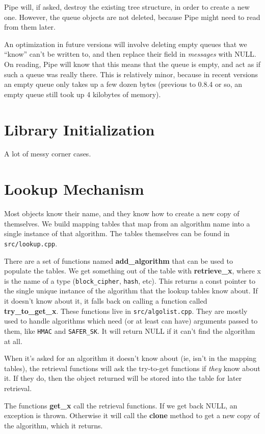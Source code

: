 \documentclass{article}
\newcommand{\filename}[1]{\texttt{#1}}
\newcommand{\function}[1]{\textbf{#1}}
\newcommand{\type}[1]{\texttt{#1}}
\renewcommand{\arg}[1]{\textsl{#1}}
\begin{document}
Pipe will, if asked, destroy the existing tree structure, in order to create a
new one. However, the queue objects are not deleted, because Pipe might need to
read from them later.

An optimization in future versions will involve deleting empty queues that we
``know'' can't be written to, and then replace their field in \arg{messages}
with NULL. On reading, Pipe will know that this means that the queue is empty,
and act as if such a queue was really there. This is relatively minor, because
in recent versions an empty queue only takes up a few dozen bytes (previous to
0.8.4 or so, an empty queue still took up 4 kilobytes of memory).

\section{Library Initialization}

A lot of messy corner cases.

\section{Lookup Mechanism}

Most objects know their name, and they know how to create a new copy of
themselves. We build mapping tables that map from an algorithm name into a
single instance of that algorithm. The tables themselves can be found in
\filename{src/lookup.cpp}.

There are a set of functions named \function{add\_algorithm} that can be used
to populate the tables. We get something out of the table with
\function{retrieve\_x}, where x is the name of a type (\texttt{block\_cipher},
\texttt{hash}, etc). This returns a const pointer to the single unique instance
of the algorithm that the lookup tables know about. If it doesn't know about
it, it falls back on calling a function called
\function{try\_to\_get\_x}. These functions live in
\filename{src/algolist.cpp}. They are mostly used to handle algorithms which
need (or at least can have) arguments passed to them, like \type{HMAC} and
\type{SAFER\_SK}. It will return NULL if it can't find the algorithm at all.

When it's asked for an algorithm it doesn't know about (ie, isn't in the
mapping tables), the retrieval functions will ask the try-to-get functions if
\emph{they} know about it. If they do, then the object returned will be stored
into the table for later retrieval.

The functions \function{get\_x} call the retrieval functions. If we get back
NULL, an exception is thrown. Otherwise it will call the \function{clone}
method to get a new copy of the algorithm, which it returns.
\end{document}
